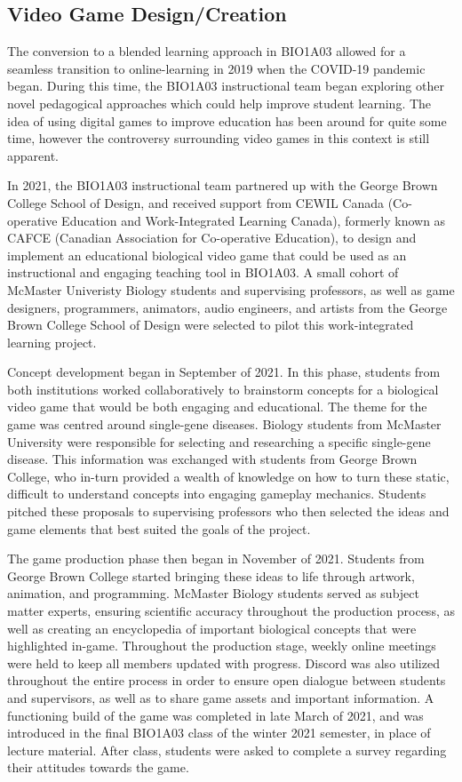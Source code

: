 \documentclass{article}
\begin{document}
\subsection{Video Game Design/Creation}

The conversion to a blended learning approach in BIO1A03 allowed for a seamless transition to online-learning in 2019 when the COVID-19 pandemic began. During this time, the BIO1A03 instructional team began exploring other novel pedagogical approaches which could help improve student learning. The idea of using digital games to improve education has been around for quite some time, however the controversy surrounding video games in this context is still apparent.

In 2021, the BIO1A03 instructional team partnered up with the George Brown College School of Design, and received support from CEWIL Canada (Co-operative Education and Work-Integrated Learning Canada), formerly known as CAFCE (Canadian Association for Co-operative Education), to design and implement an educational biological video game that could be used as an instructional and engaging teaching tool in BIO1A03. A small cohort of McMaster Univeristy Biology students and supervising professors, as well as game designers, programmers, animators, audio engineers, and artists from the George Brown College School of Design were selected to pilot this work-integrated learning project.

Concept development began in September of 2021. In this phase, students from both institutions worked collaboratively to brainstorm concepts for a biological video game that would be both engaging and educational. The theme for the game was centred around single-gene diseases. Biology students from McMaster University were responsible for selecting and researching a specific single-gene disease. This information was exchanged with students from George Brown College, who in-turn provided a wealth of knowledge on how to turn these static, difficult to understand concepts into engaging gameplay mechanics. Students pitched these proposals to supervising professors who then selected the ideas and game elements that best suited the goals of the project.

The game production phase then began in November of 2021. Students from George Brown College started bringing these ideas to life through artwork, animation, and programming. McMaster Biology students served as subject matter experts, ensuring scientific accuracy throughout the production process, as well as creating an encyclopedia of important biological concepts that were highlighted in-game. Throughout the production stage, weekly online meetings were held to keep all members updated with progress. Discord was also utilized throughout the entire process in order to ensure open dialogue between students and supervisors, as well as to share game assets and important information. A functioning build of the game was completed in late March of 2021, and was introduced in the final BIO1A03 class of the winter 2021 semester, in place of lecture material. After class, students were asked to complete a survey regarding their attitudes towards the game.
\end{document}
